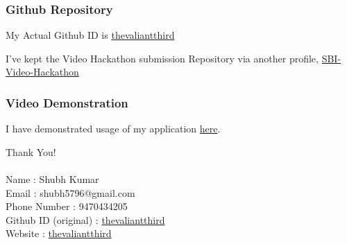 \documentclass{beamer}
\begin{document}
\begin{frame}
    \frametitle{Github Repository}

    My Actual Github ID is \href{https://github.com/thevaliantthird}{thevaliantthird}

    I've kept the Video Hackathon submission Repository via another profile, \href{https://github.com/theintrepidthird/SBI-Video-Hackathon}{SBI-Video-Hackathon}
\end{frame}

\begin{frame}
    \frametitle{Video Demonstration}

    I have demonstrated usage of my application \href{https://github.com/theintrepidthird/SBI-Video-Hackathon/blob/main/demonstration.mp4}{here}.
\end{frame}

\begin{frame}
    \begin{center}
        Thank You! \\~\\
        Name : Shubh Kumar  \\
        Email : shubh5796@gmail.com \\
        Phone Number : 9470434205 \\
        Github ID (original) : \href{https://github.com/thevaliantthird}{thevaliantthird} \\ 
        Website : \href{thevaliantthird.github.io}{thevaliantthird}
        
    \end{center}

\end{frame}
\end{document}
